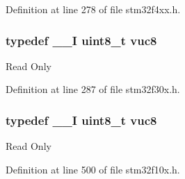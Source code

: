 Definition at line 278 of file stm32f4xx.\-h.

\hypertarget{group___exported__types_gab0ec90ac9b2c5864755998c8d37c264a}{
\subsubsection[{vuc8}]{\setlength{\rightskip}{0pt plus 5cm}typedef \-\_\-\-\_\-\-I {\bf uint8\-\_\-t} {\bf vuc8}}}\label{group___exported__types_gab0ec90ac9b2c5864755998c8d37c264a}
Read Only 

Definition at line 287 of file stm32f30x.\-h.

\hypertarget{group___exported__types_gab0ec90ac9b2c5864755998c8d37c264a}{
\subsubsection[{vuc8}]{\setlength{\rightskip}{0pt plus 5cm}typedef \-\_\-\-\_\-\-I {\bf uint8\-\_\-t} {\bf vuc8}}}\label{group___exported__types_gab0ec90ac9b2c5864755998c8d37c264a}
Read Only 

Definition at line 500 of file stm32f10x.\-h.



